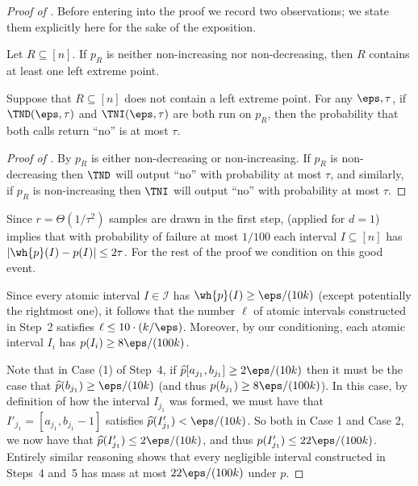 \begin{proof}[Proof of ]
Before entering into the proof we record two observations;
we state them explicitly here for the sake of the exposition.


\begin{fact} \label{fact:extreme}
Let $R \subseteq [n]$. If $p_R$ is neither non-increasing nor non-decreasing,
then $R$ contains at least one left extreme point.
\end{fact}


\begin{fact} \label{fact:testie}
Suppose that $R \subseteq [n]$ does not contain a left extreme point.
For any $\eps,\tau$, if $\TND(\eps,\tau)$ and $\TNI(\eps,\tau)$ are both run on $p_R$, then the probability that both calls return ``no'' is at most $\tau$.
\end{fact}

\begin{proof}[Proof of ]  By  $p_R$ is either non-decreasing or non-increasing. If $p_R$ is non-decreasing then $\TND$ will output ``no'' with probability at most $\tau$, and similarly, if $p_R$ is non-increasing then $\TNI$ will output ``no'' with probability at most $\tau$.
\end{proof}

Since $r = \Theta(1/\tau^2)$ samples are drawn in the first step,
{ (applied for $d=1$)}  implies that with probability of failure at most $1/100$
each interval $I \subseteq [n]$ has $| \wh{p}(I) - p(I) | \leq 2\tau$. For the
rest of the proof we condition on this good event.


Since every atomic interval $I \in \mathcal{I}$ has $\wh{p}(I) \geq
\eps/(10k)$ (except potentially the rightmost one), it follows that the
number $\ell$ of atomic intervals constructed in Step~2 satisfies $\ell \leq
10 \cdot (k/\eps)$. Moreover, {by our conditioning}, each atomic interval $I_i$
has $p(I_i) \geq 8\eps/(100k)$.


Note that in Case (1) of Step~4, if $\widehat{p}[a_{j_1},b_{j_1}] \geq 2\eps/(10k)$
then it must be the case that $\widehat{p}(b_{j_1}) \geq \eps/(10k)$ (and thus
$p(b_{j_1}) \geq 8\eps/(100k)$).  In this case, by definition of how the interval $I_{j_1}$ was formed,
we must have that $I'_{j_1}= [a_{j_1},b_{j_1}-1]$ satisfies $\widehat{p}(I'_{j_1}) < \eps/(10k)$.
So both in Case 1 and Case 2, we now have that $\widehat{p}(I'_{j_1}) \leq 2 \eps/(10k)$, and thus
$p(I'_{j_1}) \leq 22\eps/(100k)$.  Entirely similar reasoning shows that
every negligible interval constructed in Steps~4 and~5 has mass at most $22\eps/(100k)$ under $p$.



\end{proof}

